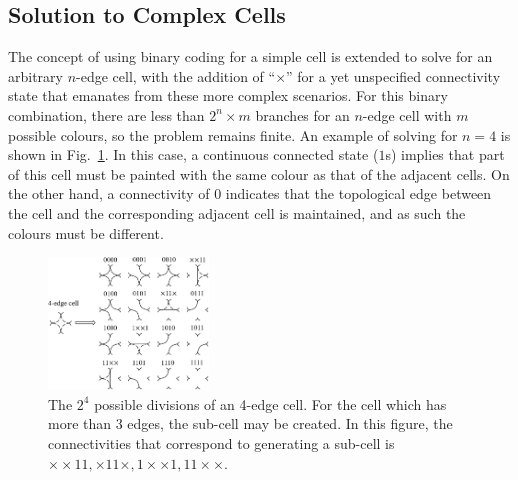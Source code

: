 \documentclass[journal]{IEEEtran}
\begin{document}
\subsection{Solution to Complex Cells}
The concept of using binary coding for a simple cell is extended to solve for an arbitrary $n$-edge cell, 
with the addition of ``$\times$'' for a yet unspecified connectivity state that emanates from these more complex scenarios. 
For this binary combination, there are less than $2^n\times m$ branches for an $n$-edge cell with $m$ possible colours, so the problem remains finite. 
An example of solving for $n=4$ is shown in Fig.~\ref{figeasycell4}.
In this case, a continuous connected state ($1$s) implies that part of this cell must be painted with the same colour as that of the adjacent cells. %
On the other hand, a connectivity of $0$ indicates that the topological edge between the cell and the corresponding adjacent cell is maintained, and as such the colours must be different. 

\begin{figure}[t]
\centering
\includegraphics[width = 0.38\textwidth]{figures/other_figures/cell4}
\caption{The $2^4$ possible divisions of an 4-edge cell. For the cell which has more than 3 edges, the sub-cell may be created. In this figure, the connectivities that correspond to generating a sub-cell is $\times\times11, \times11\times, 1\times\times1, 11\times\times$. }\label{figeasycell4}
\end{figure}
\end{document}
